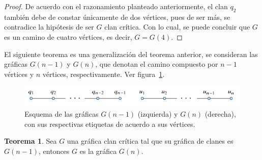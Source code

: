 \documentclass[12pt]{book}
\theoremstyle{definition}
\newtheorem{theorem}{Teorema}[chapter]
\begin{document}
\begin{proof}
De acuerdo con el razonamiento planteado anteriormente, el clan $q_2$ también debe de constar únicamente de dos vértices, pues de ser más, se contradice la hipótesis de ser $G$ clan crítica. Con lo cual, se puede concluir que $G$ es un camino de cuatro vértices, es decir, $G=G(4)$.
\end{proof}

El siguiente teorema es una generalización del teorema anterior, se consideran las gráficas $G(n-1)$ y $G(n)$, que denotan el camino compuesto por $n-1$ vértices y $n$ vértices, respectivamente. Ver figura~\ref{F7}.

\begin{figure}[!htbp]
	\centering
	\includegraphics[scale=1.2]{Fig6.pdf}
	\caption{Esquema de las gráficas $G(n-1)$ (izquierda) y $G(n)$ (derecha), con sus respectivas etiquetas de acuerdo a sus vértices.\label{F7}}
\end{figure}

\begin{theorem}
Sea $G$ una gráfica clan crítica tal que su gráfica de clanes es $G(n-1)$, entonces $G$ es la gráfica $G(n)$.
\end{theorem}
\end{document}
